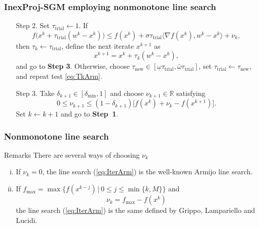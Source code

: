 \documentclass[xcolor=dvipsnames,aspectratio=169,13pt]{beamer} %
\begin{document}
\begingroup
\small
\begin{frame}[t]
  \frametitle{InexProj-SGM employing nonmonotone line search}

  \begin{enumerate}
    \item[Step 2.] Set $\tau_{\textrm{trial}} \gets 1$. If
    \begin{equation}\label{eq:TkArm}
       f\Big(x^{k}+ \tau_{\textrm{trial}}(w^k - x^{k})\Big) \leq f(x^{k}) + \sigma \tau_{\textrm{trial}}\Big\langle \nabla f(x^{k}), w^k - x^{k} \Big\rangle + \nu_k,
    \end{equation}
    then  $\tau_k\gets \tau_{\textrm{trial}}$, define the next iterate $x^{k+1}$ as
    \begin{equation} \label{eq:IterArm}
      x^{k+1} = x^{k} + \tau_k (w^k - x^{k}),
    \end{equation}
    and go to {\bf Step 3}. Otherwise, choose $\tau_{\textrm{new}} \in [\underline\omega \tau_{\textrm{trial}}, \bar\omega \tau_{\textrm{trial}} ]$, set $\tau_{\textrm{trial}} \gets \tau_{\textrm{new}}$, and repeat test \eqref{eq:TkArm}.
    
    \item [Step 3.] Take  $\delta_{k+1}\in [\delta_{\min}, 1]$ and choose    $\nu_{k+1}\in {\mathbb R}$ satisfying
    \begin{equation*} 
      0\leq \nu_{k+1}\leq (1-\delta_{k+1})\Big[f(x^{k})+\nu_{k}-f(x^{k+1})\Big].
    \end{equation*}
    Set $k\gets k+1$ and go to \textbf{Step~1}.
  \end{enumerate}
\end{frame}
\endgroup

\begin{frame}[t]\frametitle{Nonmonotone line search}
  \begin{block}{Remarks}
  There are several ways of choosing $\nu_k$
    \begin{enumerate}[(i)]
      \item If $\nu_k = 0$, the line search (\ref{eq:IterArm}) is the well-known Armijo line search.
      \item If $f_{\max} = \max\{f(x^{k-j})\, | \, 0\leq j\leq \min\{k,M\}\}$ and
            \begin{equation}\label{eq:nuGLL}
              \nu_k = f_{\max} - f(x^k)
            \end{equation}
            the line search (\ref{eq:IterArm}) is the same defined by Grippo, Lampariello and Lucidi.
    \end{enumerate}
  \end{block}
\end{frame}
\end{document}
